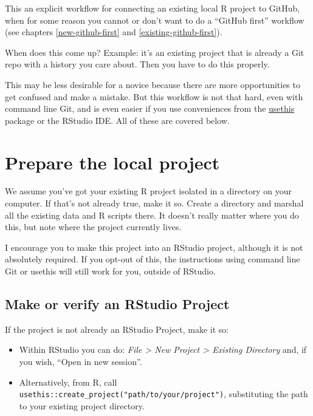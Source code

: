 \documentclass[
]{book}
\providecommand{\tightlist}{%
  \setlength{\itemsep}{0pt}\setlength{\parskip}{0pt}}
\begin{document}
This an explicit workflow for connecting an existing local R project to GitHub, when for some reason you cannot or don't want to do a ``GitHub first'' workflow (see chapters \ref{new-github-first} and \ref{existing-github-first}).

When does this come up?
Example: it's an existing project that is already a Git repo with a history you care about.
Then you have to do this properly.

This may be less desirable for a novice because there are more opportunities to get confused and make a mistake.
But this workflow is not that hard, even with command line Git, and is even easier if you use conveniences from the \href{https://cran.r-project.org/package=usethis}{usethis} package or the RStudio IDE.
All of these are covered below.

\section{Prepare the local project}\label{prepare-the-local-project}

We assume you've got your existing R project isolated in a directory on your computer.
If that's not already true, make it so.
Create a directory and marshal all the existing data and R scripts there.
It doesn't really matter where you do this, but note where the project currently lives.

I encourage you to make this project into an RStudio project, although it is not absolutely required.
If you opt-out of this, the instructions using command line Git or usethis will still work for you, outside of RStudio.

\subsection{Make or verify an RStudio Project}\label{make-or-verify-an-rstudio-project}

If the project is not already an RStudio Project, make it so:

\begin{itemize}
\tightlist
\item
  Within RStudio you can do: \emph{File \textgreater{} New Project \textgreater{} Existing Directory} and, if you wish, ``Open in new session''.
\item
  Alternatively, from R, call \texttt{usethis::create\_project("path/to/your/project")}, substituting the path to your existing project directory.
\end{itemize}
\end{document}
